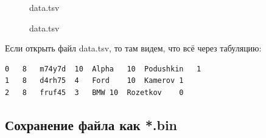 \begin{figure}[p]
    \caption{data.tsv}
    \label{fig:data-tsv}
\end{figure}

\begin{figure}[p]
    \caption{data.tsv}
    \label{fig:data-tsv-on-github}
\end{figure}

Если открыть файл data.tsv, то там видем, что всё через табуляцию:
\begin{tcolorbox}
\begin{verbatim}
0	8	m74y7d	10	Alpha	10	Podushkin	1
1	8	d4rh75	4	Ford	10	Kamerov	1
2	8	fruf45	3	BMW	10	Rozetkov	0
\end{verbatim}
\end{tcolorbox}

\newpage

\subsection{Сохранение файла как *.bin}

